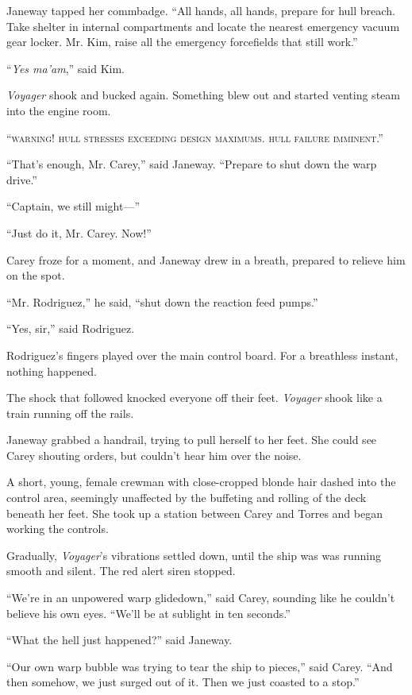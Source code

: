 \documentclass[twoside,letterpaper,12pt]{memoir}
\begin{document}
Janeway tapped her commbadge. ``All hands, all hands, prepare for hull breach. Take shelter in internal compartments and locate the nearest emergency vacuum gear locker. Mr. Kim, raise all the emergency forcefields that still work.''

``\textit{Yes ma'am},'' said Kim.

\textit{Voyager} shook and bucked again. Something blew out and started venting steam into the engine room.

``\textsc{warning! hull stresses exceeding design maximums. hull failure imminent}.''

``That's enough, Mr. Carey,'' said Janeway. ``Prepare to shut down the warp drive.''

``Captain, we still might---''

``Just do it, Mr. Carey. Now!''

Carey froze for a moment, and Janeway drew in a breath, prepared to relieve him on the spot.

``Mr. Rodriguez,'' he said, ``shut down the reaction feed pumps.''

``Yes, sir,'' said Rodriguez.

Rodriguez's fingers played over the main control board. For a breathless instant, nothing happened.

The shock that followed knocked everyone off their feet. \textit{Voyager} shook like a train running off the rails.

Janeway grabbed a handrail, trying to pull herself to her feet. She could see Carey shouting orders, but couldn't hear him over the noise.

A short, young, female crewman with close-cropped blonde hair dashed into the control area, seemingly unaffected by the buffeting and rolling of the deck beneath her feet. She took up a station between Carey and Torres and began working the controls.

Gradually, \textit{Voyager}'s vibrations settled down, until the ship was was running smooth and silent. The red alert siren stopped.

``We're in an unpowered warp glidedown,'' said Carey, sounding like he couldn't believe his own eyes. ``We'll be at sublight in ten seconds.''

``What the hell just happened?'' said Janeway.

``Our own warp bubble was trying to tear the ship to pieces,'' said Carey. ``And then somehow, we just surged out of it. Then we just coasted to a stop.''
\end{document}
